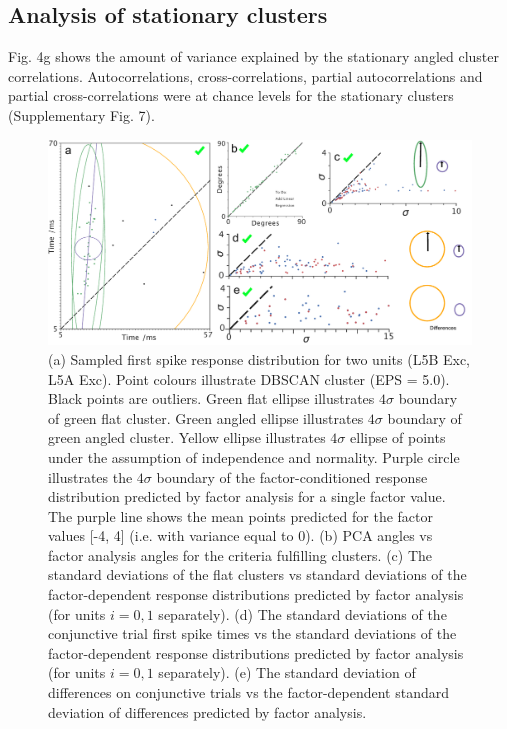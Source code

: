 \documentclass{article}
\begin{document}
\subsection*{Analysis of stationary clusters}
Fig. 4g shows the amount of variance explained by the stationary angled cluster correlations. Autocorrelations, cross-correlations, partial autocorrelations and partial cross-correlations were at chance levels for the stationary clusters (Supplementary Fig. 7).


\begin{figure}[t!]
\centering
\includegraphics[width=\textwidth]{Figure5.pdf}
\caption{(a) Sampled first spike response distribution for two units (L5B Exc, L5A Exc). Point colours illustrate DBSCAN cluster (EPS = 5.0). Black points are outliers. Green flat ellipse illustrates $4\sigma$ boundary of green flat cluster. Green angled ellipse illustrates $4\sigma$ boundary of green angled cluster. Yellow ellipse illustrates $4\sigma$ ellipse of points under the assumption of independence and normality. Purple circle illustrates the $4\sigma$ boundary of the factor-conditioned response distribution predicted by factor analysis for a single factor value. The purple line shows the mean points predicted for the factor values [-4, 4] (i.e. with variance equal to 0). (b) PCA angles vs factor analysis angles for the criteria fulfilling clusters. (c) The standard deviations of the flat clusters vs standard deviations of the factor-dependent response distributions predicted by factor analysis (for units $i = 0,1$ separately). (d) The standard deviations of the conjunctive trial first spike times vs the standard deviations of the factor-dependent response distributions predicted by factor analysis (for units $i = 0,1$ separately). (e) The standard deviation of differences on conjunctive trials vs the factor-dependent standard deviation of differences predicted by factor analysis.}
\label{fig:universe}
\end{figure}
\end{document}
